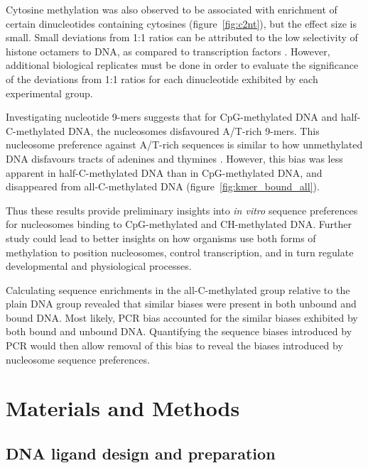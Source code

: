 \documentclass[parskip=full, numbers=noenddot]{scrbook}
\begin{document}
Cytosine methylation was also observed to be associated with enrichment of certain dinucleotides containing cytosines (figure~\ref{fig:c2nt}), but the effect size is small.  Small deviations from 1:1 ratios can be attributed to the low selectivity of histone octamers to DNA, as compared to transcription factors \citep{struhl_determinants_2013}. %
However, additional biological replicates must be done in order to evaluate the significance of the deviations from 1:1 ratios for each dinucleotide exhibited by each experimental group.

Investigating nucleotide 9-mers suggests that for CpG-methylated DNA and half-C-methylated DNA, the nucleosomes disfavoured A/T-rich 9-mers.  This nucleosome preference against A/T-rich sequences is similar to how unmethylated DNA disfavours tracts of adenines and thymines \citep{struhl_determinants_2013}. However, this bias was less apparent in half-C-methylated DNA than in CpG-methylated DNA, and disappeared from all-C-methylated DNA (figure~\ref{fig:kmer_bound_all}).

Thus these results provide preliminary insights into \emph{in vitro} sequence preferences for nucleosomes binding to CpG-methylated and CH-methylated DNA.  Further study could lead to better insights on how organisms use both forms of methylation to position nucleosomes, control transcription, and in turn regulate developmental and physiological processes.

Calculating sequence enrichments in the all-C-methylated group relative to the plain DNA group revealed that similar biases were present in both unbound and bound DNA.  Most likely, PCR bias accounted for the similar biases exhibited by both bound and unbound DNA.  Quantifying the sequence biases introduced by PCR would then allow removal of this bias to reveal the biases introduced by nucleosome sequence preferences.

\section{Materials and Methods}
\label{sec:emsaselex_methods}

\subsection{DNA ligand design and preparation}
\label{ssec:emsaselex_methods_lig}
\end{document}
